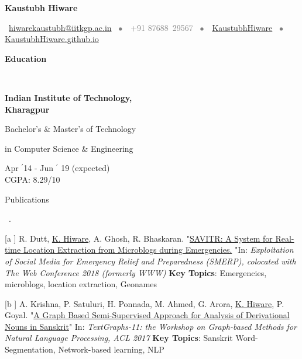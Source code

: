 \documentclass[11pt, a4paper]{resume}
\newcommand{\important}[1]{
  \textcolor{mypurple}{#1}
}
\newcommand{\greyed}[1]{
  \textcolor{gray}{#1}
}
\newcommand{\titleX}[1]{
  \begin{LARGE}
      \important{\centerline{\textbf{#1}}}
    \end{LARGE}
}
\newcommand{\fillit}[1]{
  \leavevmode\xleaders\hbox{#1}\hfill\kern0pt
}
\newcommand{\sectionTitle}[1]{
  \begin{Large}
      \important{\textbf{#1}} 
    \end{Large}
    \important{\rlap{\rule[.5ex]{\linegoal}{0.5pt}}{}}
     \vspace{0.1em}\\
}
\newcommand{\sectionSubtitleX}[1]{
  \begin{large}
    \important{#1}
    \end{large}
    \fillit{\important{.}}
}
\newcommand{\education}[3]{ %
\noindent\parbox{.3\textwidth}{\bf #1\hfill}\parbox{.45\textwidth}{\hfil #2\hfil}\parbox{.25\textwidth}{\hfill #3}
}
\begin{document}
\titleX{Kaustubh Hiware}
\normalsize
\vspace{6pt}
\greyed{\centerline{\faEnvelopeO \, \href{mailto:hiwarekaustubh@iitkgp.ac.in}{ hiwarekaustubh@iitkgp.ac.in} \, $\bullet$ \,\faMobile\, +91 87688\, 29567 \, $\bullet$ \,\faGithub \, \href{https://github.com/kaustubhhiware}{KaustubhHiware} \,  $\bullet$ \, \faGlobe \, \href{https://kaustubhhiware.github.io}{KaustubhHiware.github.io}}}

\vspace{-2em}

\sectionTitle{Education\vspace{0.5em}}
\education{Indian Institute of Technology,\\ Kharagpur}{\centerline{Bachelor's \& Master's of Technology} \centerline{in Computer Science \& Engineering}}{Apr $^{\prime}$14 - Jun $^{\prime}$ 19 (expected) \\\hspace*{\fill} CGPA: 8.29/10}

\sectionSubtitleX{Publications}
\begin{list}{}{ %
    \setlength{\leftmargin}{1.5em} %
  }
\item [[a\hspace{-0.5em}]] R. Dutt, \underline{K. Hiware}, A. Ghosh, R. Bhaskaran. "\href{https://www.cse.iitk.ac.in/users/kripa/smerp2018/savitr-system-real-ritam.pdf}{SAVITR: A System for Real-time Location Extraction from Microblogs during Emergencies.} "In: \textit{Exploitation of Social Media for Emergency Relief and Preparedness (SMERP), colocated with The Web Conference 2018 (formerly WWW)} \hspace*{\fill}\textbf{\small Key Topics}: Emergencies, microblogs, location extraction, Geonames

\item [[b\hspace{-0.5em}]] A. Krishna, P. Satuluri, H. Ponnada, M. Ahmed, G. Arora, \underline{K. Hiware}, P. Goyal. "\href{http://www.aclweb.org/anthology/W17-2409}{A Graph Based Semi-Supervised Approach for Analysis of Derivational Nouns in Sanskrit}" In: \textit{TextGraphs-11: the Workshop on Graph-based Methods for Natural Language Processing, ACL 2017} \hspace*{\fill}\textbf{\small Key Topics}: Sanskrit Word-Segmentation, Network-based learning, NLP
\end{list}
\end{document}
